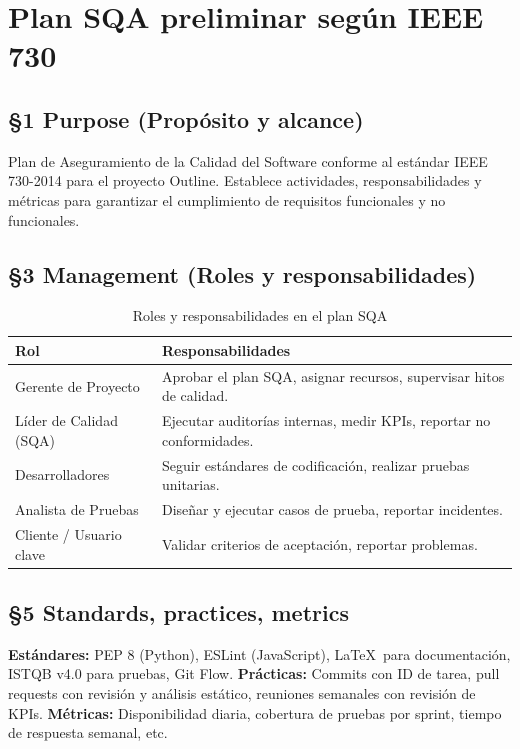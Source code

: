 \documentclass[12pt]{article}
\begin{document}
\section{Plan SQA preliminar según IEEE 730}

\subsection{§1 Purpose (Propósito y alcance)}
Plan de Aseguramiento de la Calidad del Software conforme al estándar IEEE 730-2014 \cite{ieee730} para el proyecto Outline. Establece actividades, responsabilidades y métricas para garantizar el cumplimiento de requisitos funcionales y no funcionales.

\subsection{§3 Management (Roles y responsabilidades)}
\begin{table}[H]
\centering
\caption{Roles y responsabilidades en el plan SQA}
\begin{tabular}{|l|p{8cm}|}
\hline
\textbf{Rol} & \textbf{Responsabilidades} \\ \hline
Gerente de Proyecto & Aprobar el plan SQA, asignar recursos, supervisar hitos de calidad. \\ \hline
Líder de Calidad (SQA) & Ejecutar auditorías internas, medir KPIs, reportar no conformidades. \\ \hline
Desarrolladores & Seguir estándares de codificación, realizar pruebas unitarias. \\ \hline
Analista de Pruebas & Diseñar y ejecutar casos de prueba, reportar incidentes. \\ \hline
Cliente / Usuario clave & Validar criterios de aceptación, reportar problemas. \\ \hline
\end{tabular}
\end{table}

\subsection{§5 Standards, practices, metrics}
\textbf{Estándares:} PEP 8 (Python), ESLint (JavaScript), \LaTeX\ para documentación, ISTQB v4.0 para pruebas, Git Flow.
\textbf{Prácticas:} Commits con ID de tarea, pull requests con revisión y análisis estático, reuniones semanales con revisión de KPIs.
\textbf{Métricas:} Disponibilidad diaria, cobertura de pruebas por sprint, tiempo de respuesta semanal, etc.
\end{document}

